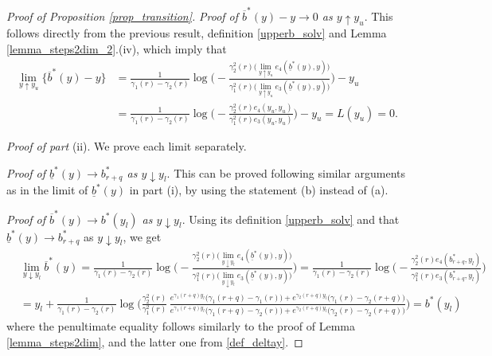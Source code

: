 \documentclass[11pt]{article} %
\newcommand{\ubar}[1]{\underaccent{\bar}{#1}}
\numberwithin{komcounter}{section}
\renewcommand{\ubar}{\underline}
\renewcommand{\bar}{\overline}
\numberwithin{equation}{section}
\numberwithin{theorem}{section}
\begin{document}
\begin{proof}[Proof of Proposition \ref{prop_transition}]
{\it Proof of $\bar{b}^*(y) - y \to 0$ as $y\uparrow y_u$}.
This follows directly from the previous result, definition \eqref{upperb_solv} and Lemma \ref{lemma_steps2dim_2}.(iv), which imply that 
\begin{align*}
\lim_{y\uparrow y_u} \big\{\bar{b}^*(y) - y\big\} 
&= \frac{1}{\gamma_1(r)-\gamma_2(r)} \log\bigg(-\frac{\gamma_2^2(r) \big(\lim_{y\uparrow y_u} e_4(\ubar{b}^*(y),y)\big)}{\gamma_1^2(r) \big(\lim_{y\uparrow y_u} e_3(\ubar{b}^*(y),y) \big)}\bigg) - y_u \\
&= \frac{1}{\gamma_1(r)-\gamma_2(r)} \log\bigg(-\frac{\gamma_2^2(r) e_4(y_u,y_u)}{\gamma_1^2(r) e_3(y_u,y_u)} \bigg) - y_u = L(y_u) = 0. 
\end{align*}

\vspace{1mm}
{\it Proof of part} (ii).
We prove each limit separately. 

{\it Proof of $\ubar{b}^*(y) \to b_{r+q}^*$ as $y\downarrow y_l$}.
This can be proved following similar arguments as in the limit of $\ubar{b}^*(y)$ in part (i), by using the statement (b) instead of (a).

{\it Proof of $\bar{b}^*(y) \to b^*(y_l)$ as $y\downarrow y_l$}.
Using its definition \eqref{upperb_solv} and that $\ubar{b}^*(y) \to b_{r+q}^*$ as $y\downarrow y_l$, we get
\begin{align*}
&\lim_{y\downarrow y_l} \bar{b}^*(y) 
= \frac{1}{\gamma_1(r)-\gamma_2(r)} \log\bigg(-\frac{\gamma_2^2(r) \big(\lim_{y\downarrow y_l} e_4(\ubar{b}^*(y),y)\big)}{\gamma_1^2(r) \big(\lim_{y\downarrow y_l} e_3(\ubar{b}^*(y),y) \big)}\bigg) 
= \frac{1}{\gamma_1(r)-\gamma_2(r)} \log\bigg(-\frac{\gamma_2^2(r) e_4(b_{r+q}^*,y_l)}{\gamma_1^2(r) e_3(b_{r+q}^*,y_l)} \bigg) \\
&= y_l + \frac{1}{\gamma_1(r)-\gamma_2(r)} \log\bigg(\frac{\gamma_2^2(r)}{\gamma_1^2(r)} \, \frac{e^{\gamma_1(r+q)y_l}\bigl(\gamma_1(r+q) - \gamma_1(r)\bigr) + e^{\gamma_2(r+q)y_l}\bigl(\gamma_1(r) - \gamma_2(r+q)\bigr)}{e^{\gamma_1(r+q)y_l}\bigl(\gamma_1(r+q) - \gamma_2(r)\bigr) + e^{\gamma_2(r+q)y_l}\bigl(\gamma_2(r) - \gamma_2(r + q)\bigr)} \bigg) 
= b^*(y_l)
\end{align*}
where the penultimate equality follows similarly to the proof of Lemma \ref{lemma_steps2dim}, and the latter one from \eqref{def_deltay}.
\end{proof}
\end{document}
